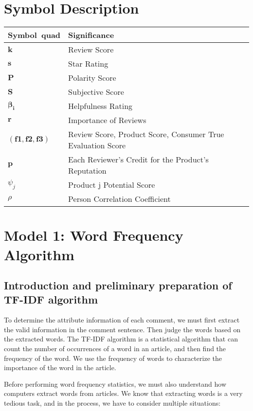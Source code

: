 \documentclass[UTF8]{article}
\begin{document}
\section*{Symbol Description}
\begin{table}[h]
\centering

\begin{tabular}{lll}
	\toprule
	Symbol\ quad\quad\quad\quad\quad\quad\quad\quad\quad &Significance  \\
	\midrule
	$ \mathbf{k}  $   &  Review Score
	\\
	$ \mathbf{s}  $   & Star Rating
	\\
	$ \mathbf{P}  $   & Polarity Score
	\\
	$ \mathbf{S}  $   & Subjective Score
	\\
	$  \mathbf{\beta_i} $   & Helpfulness Rating
	\\
	$\mathbf{r}   $   & Importance of Reviews
	\\
	$ (\boldsymbol{f1},\boldsymbol{f2},\boldsymbol{f3})  $   & Review Score, Product Score, Consumer True Evaluation Score
	\\
	$  \mathbf{p} $   &Each Reviewer's Credit for the Product's Reputation
	\\
	$ \psi_j $   &  Product j Potential Score
	\\
	$  \rho $   & Person Correlation Coefficient
	\\	
	\bottomrule
\end{tabular}
\end{table}

\section{Model 1: Word Frequency Algorithm}
\subsection{Introduction and preliminary preparation of TF-IDF algorithm}

To determine the attribute information of each comment, we must first extract the valid information in the comment sentence. Then judge the words based on the extracted words. The TF-IDF algorithm is a statistical algorithm that can count the number of occurrences of a word in an article, and then find the frequency of the word. We use the frequency of words to characterize the importance of the word in the article.

Before performing word frequency statistics, we must also understand how computers extract words from articles. We know that extracting words is a very tedious task, and in the process, we have to consider multiple situations:
\end{document}
